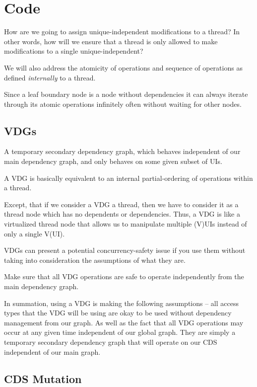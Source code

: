 \section{Code}

How are we going to assign unique-independent modifications to a thread? In other words, how will we ensure that a thread is only allowed to make modifications to a single unique-independent?

We will also address the atomicity of operations and sequence of operations as defined \textit{internally} to a thread.

Since a leaf boundary node is a node without dependencies it can always iterate through its atomic operations infinitely often without waiting for other nodes.

\subsection{VDGs}

\begin{con-def}
	\label{vdg-code}
 A temporary secondary dependency graph, which behaves independent of our main dependency graph, and only behaves on some given subset of UIs.
\end{con-def}

A VDG is basically equivalent to an internal partial-ordering of operations within a thread.

Except, that if we consider a VDG a thread, then we have to consider it as a thread node which has no dependents or dependencies. Thus, a VDG is like a virtualized thread node that allows us to manipulate multiple (V)UIs instead of only a single V(UI).

VDGs can present a potential concurrency-safety issue if you use them without taking into consideration the assumptions of what they are.

Make sure that all VDG operations are safe to operate independently from the main dependency graph.

In summation, using a VDG is making the following assumptions -- all access types that the VDG will be using are okay to be used without dependency management from our graph. As well as the fact that all VDG operations may occur at any given time independent of our global graph. They are simply a temporary secondary dependency graph that will operate on our CDS independent of our main graph.

\subsection{CDS Mutation}

